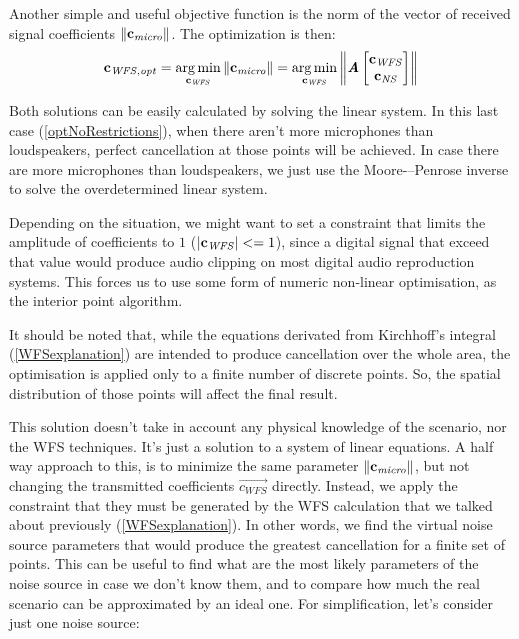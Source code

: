 Another simple and useful objective function is the norm of the vector of received signal coefficients $\left\| \mathbf{c_\mathit{micro}} \right\|$. The optimization is then:
\begin{equation}
\mathbf{c_{\mathit{WFS}, \mathit{opt}}} =
\operatorname*{arg\,min}_{\mathbf{c_\mathit{WFS}}}
\left\| \mathbf{c_\mathit{micro}} \right\| =
\operatorname*{arg\,min}_{\mathbf{c_\mathit{WFS}}}
\left\| \bm{\mathit{A}}
\begin{bmatrix}
\mathbf{c_\mathit{WFS}}\\
\mathbf{c_\mathit{NS}}\\
\end{bmatrix}
 \right\|
\label{optNoRestrictions}
\end{equation}

Both solutions can be easily calculated by solving the linear system. In this last case (\autoref{optNoRestrictions}), when there aren't more microphones than loudspeakers, perfect cancellation at those points will be achieved. In case there are more microphones than loudspeakers, we just use the Moore-–Penrose inverse to solve the overdetermined linear system.

Depending on the situation, we might want to set a constraint that limits the amplitude of coefficients to $1$ ($\left | \mathbf{c}_{\mathit{WFS}} \right | <= 1$), since a digital signal that exceed that value would produce audio clipping on most digital audio reproduction systems. This forces us to use some form of numeric non-linear optimisation, as the interior point algorithm.

It should be noted that, while the equations derivated from Kirchhoff's integral (\autoref{WFSexplanation}) are intended to produce cancellation over the whole area, the optimisation is applied only to a finite number of discrete points. So, the spatial distribution of those points will affect the final result.

This solution doesn't take in account any physical knowledge of the scenario, nor the WFS techniques. It's just a solution to a system of linear equations. A half way approach to this, is to minimize the same parameter $\left\| \mathbf{c_\mathit{micro}} \right\|$, but not changing the transmitted coefficients $\vec{c_{\mathit{WFS}}}$ directly. Instead, we apply the constraint that they must be generated by the WFS calculation that we talked about previously (\autoref{WFSexplanation}). In other words, we find the virtual noise source parameters that would produce the greatest cancellation for a finite set of points. This can be useful to find what are the most likely parameters of the noise source in case we don't know them, and to compare how much the real scenario can be approximated by an ideal one. For simplification, let's consider just one noise source:

